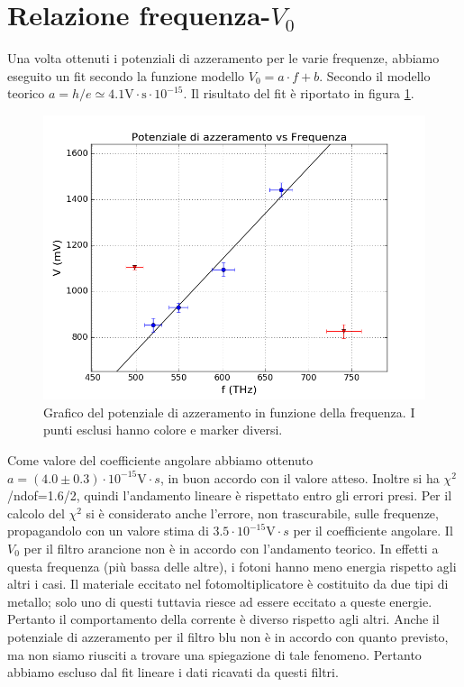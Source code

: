 \documentclass[10pt,a4paper]{article}
\begin{document}
\section{Relazione frequenza-$V_0$}
Una volta ottenuti i potenziali di azzeramento per le varie frequenze, abbiamo eseguito un fit secondo la funzione modello $V_0=a\cdot f + b$.
Secondo il modello teorico $a = h/e\simeq 4.1 \mbox{V}\cdot\mbox{s}\cdot10^{-15}$.
Il risultato del fit è riportato in figura \ref{fig:fitfinale}.
\begin{figure}[!htb]
\centering
\includegraphics[scale=0.7]{fitfinale.png}
\caption{Grafico del potenziale di azzeramento in funzione della frequenza. I punti esclusi hanno colore e marker diversi.\label{fig:fitfinale}}
\end{figure}

Come valore del coefficiente angolare abbiamo ottenuto $a = (4.0\pm 0.3)\cdot10^{-15} \mbox{V}\cdot{s}$, in buon accordo con il valore atteso.
Inoltre si ha $\chi ^2$/ndof=1.6/2, quindi l'andamento lineare è rispettato entro gli errori presi. 
Per il calcolo del $\chi^2$ si è considerato anche l'errore, non trascurabile, sulle frequenze, propagandolo con un valore stima di $3.5\cdot 10^{-15}\mbox{V}\cdot{s}$ per il coefficiente angolare.
Il $V_0$ per il filtro arancione non è in accordo con l'andamento teorico. In effetti a questa frequenza (più bassa delle altre), i fotoni hanno meno energia rispetto agli altri i casi. Il materiale eccitato nel fotomoltiplicatore è costituito da due tipi di metallo; solo uno di questi tuttavia riesce ad essere eccitato a queste energie. Pertanto il comportamento della corrente è  diverso rispetto agli altri.
Anche il potenziale di azzeramento per il filtro blu non è in accordo con quanto previsto, ma non siamo riusciti a trovare una spiegazione di tale fenomeno. Pertanto abbiamo escluso dal fit lineare i dati ricavati da questi filtri.
\end{document}
